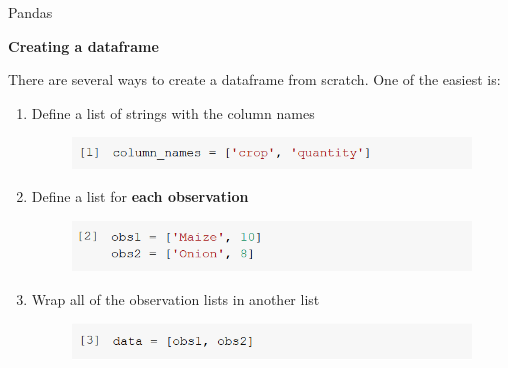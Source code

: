 \documentclass[aspectratio=169]{beamer}
\begin{document}
\begin{frame}{Pandas}

	\textbf{Creating a dataframe}

	There are several ways to create a dataframe from scratch. One of the easiest is:

	\begin{enumerate}
		\item Define a list of strings with the column names
		\begin{figure}
			\includegraphics[width=0.8\linewidth]{img/column_names.png}
		\end{figure}
		\item Define a list for \textbf{each observation}
		\begin{figure}
			\includegraphics[width=0.8\linewidth]{img/observation_lists.png}
		\end{figure}
		\item Wrap all of the observation lists in another list
		\begin{figure}
			\includegraphics[width=0.8\linewidth]{img/data_list.png}
		\end{figure}

	\end{enumerate}

\end{frame}
\end{document}
